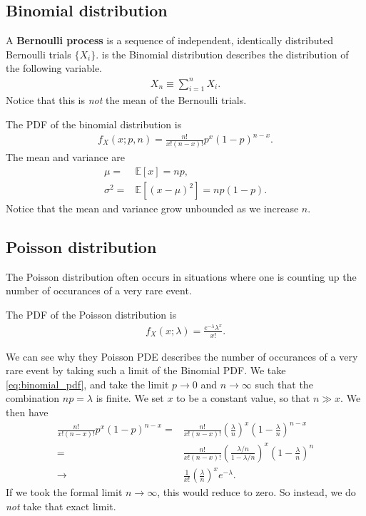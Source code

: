 \subsection{Binomial distribution}
A \textbf{Bernoulli process} is a sequence of independent, identically distributed Bernoulli trials $\{X_i\}$.
is the Binomial distribution describes the distribution of the following variable. 
\begin{align}
    X_n
    \equiv
    \sum_{i=1}^n X_i
    .
\end{align}
Notice that this is \emph{not} the mean of the Bernoulli trials.

The PDF of the binomial distribution is
\begin{align}
\label{eq:binomial_pdf}
    f_X\left(x;p,n\right)
    =
    \frac{n!}{x!\left(n-x\right)!} p^x\left(1-p\right)^{n-x}
    .
\end{align}
The mean and variance are
\begin{align}
    \mu
    =&
    \mathbb{E}\left[x\right]
    =
    np 
    ,\\
    \sigma^2
    =&
    \mathbb{E}\left[\left(x-\mu\right)^2\right]
    =
    np\left(1-p\right) 
    .
\end{align}
Notice that the mean and variance grow unbounded as we increase $n$.

\subsection{Poisson distribution}
The Poisson distribution often occurs in situations where one is counting up the number of occurances of a very rare event.

The PDF of the Poisson distribution is
\begin{align}
    \label{eq:poisson_pdf}
    f_X\left(x;\lambda\right)
    =
    \frac{e^{-\lambda}\lambda^x}{x!}
    .
\end{align}

We can see why they Poisson PDE describes the number of occurances of a very rare event by taking such a limit of the Binomial PDF.
We take \eqref{eq:binomial_pdf}, and take the limit $p\to0$ and $n\to\infty$ such that the combination $np=\lambda$ is finite.
We set $x$ to be a constant value, so that $n\gg x$.
We then have
\begin{align}
    \frac{n!}{x!\left(n-x\right)!} 
    p^x \left(1-p\right)^{n-x} 
    =&
    \frac{n!}{x!\left(n-x\right)!} \left(\frac{\lambda}{n}\right)^x \left(1-\frac{\lambda}{n}\right)^{n-x} 
    \nonumber\\
    =&
    \frac{n!}{x!\left(n-x\right)!} \left(\frac{\lambda/n}{1-\lambda/n}\right)^x \left(1-\frac{\lambda}{n}\right)^{n} 
    \nonumber\\
    \to&
    \frac{1}{x!}\left(\frac{\lambda}{n}\right)^xe^{-\lambda}
    .
\end{align}
If we took the formal limit $n\to\infty$, this would reduce to zero.
So instead, we do \emph{not} take that exact limit.


